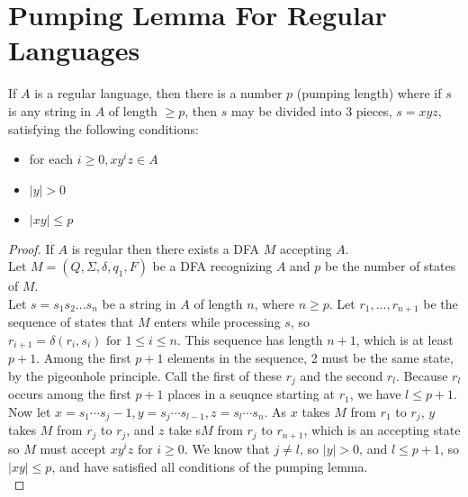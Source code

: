 \documentclass[11pt,a4paper]{article}
\begin{document}
\section{Pumping Lemma For Regular Languages}
\begin{theorem}
    If $A$ is a regular language, then there is a number $p$ (pumping length) where if $s$ is any string in $A$ of length $\geq p$, then $s$ may be divided into 3 pieces, $s=xyz$, satisfying the following conditions:
    \begin{itemize}
        \item for each $i\geq 0,xy^iz\in A$
        \item $|y|>0$
        \item $|xy|\leq p$
    \end{itemize}

    \begin{proof}
        If $A$ is regular then there exists a DFA $M$ accepting $A$. \\

        Let $M=(Q,\Sigma,\delta,q_1,F)$ be a DFA recognizing $A$ and $p$ be the number of states of $M$. \\

        Let $s=s_1s_2...s_n$ be a string in $A$ of length $n$, where $n\geq p$. Let $r_1,...,r_{n+1}$ be the sequence of states that $M$ enters while processing $s$, so $r_{i+1}=\delta(r_i,s_i)\text{ for }1\leq i\leq n$.
        This sequence has length $n+1$, which is at least $p+1$.
        Among the first $p+1$ elements in the sequence, 2 must be the same state, by the pigeonhole principle.
        Call the first of these $r_j$ and the second $r_l$. Because $r_l$ occurs among the first $p+1$ places in a seuqnce starting at $r_1$, we have $l\leq p+1$. \\

        Now let $x=s_1\cdots s_j-1,y=s_j\cdots s_{l-1},z=s_l\cdots s_n$. As $x$ takes $M$ from $r_1$ to $r_j$, $y$ takes $M$ from $r_j$ to $r_j$, and $z$ take s$M$ from $r_j$ to $r_{n+1}$, which is an accepting state so $M$ must accept $xy^iz\text{ for }i\geq 0$.
        We know that $j\neq l$, so $|y|>0$, and $l\leq p+1$, so $|xy|\leq p$, and have satisfied all conditions of the pumping lemma. \\

    \end{proof}
\end{theorem}
\end{document}

